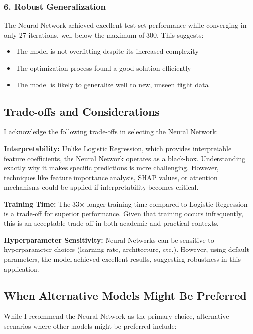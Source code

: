\documentclass[sigconf]{acmart}
\begin{document}
\subsubsection{6. Robust Generalization}

The Neural Network achieved excellent test set performance while converging in only 27 iterations, well below the maximum of 300. This suggests:
\begin{itemize}
    \item The model is not overfitting despite its increased complexity
    \item The optimization process found a good solution efficiently
    \item The model is likely to generalize well to new, unseen flight data
\end{itemize}

\subsection{Trade-offs and Considerations}

I acknowledge the following trade-offs in selecting the Neural Network:

\textbf{Interpretability:} Unlike Logistic Regression, which provides interpretable feature coefficients, the Neural Network operates as a black-box. Understanding exactly why it makes specific predictions is more challenging. However, techniques like feature importance analysis, SHAP values, or attention mechanisms could be applied if interpretability becomes critical.

\textbf{Training Time:} The 33× longer training time compared to Logistic Regression is a trade-off for superior performance. Given that training occurs infrequently, this is an acceptable trade-off in both academic and practical contexts.

\textbf{Hyperparameter Sensitivity:} Neural Networks can be sensitive to hyperparameter choices (learning rate, architecture, etc.). However, using default parameters, the model achieved excellent results, suggesting robustness in this application.

\subsection{When Alternative Models Might Be Preferred}

While I recommend the Neural Network as the primary choice, alternative scenarios where other models might be preferred include:
\end{document}
